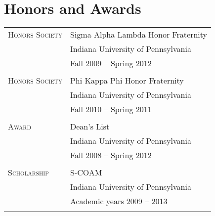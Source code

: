 \documentclass[10pt]{article}
\begin{document}
\section{Honors and Awards}
\begin{tabularx}{0.97\linewidth}{>{\raggedleft\scshape}p{3cm}X}
  Honors Society & Sigma Alpha Lambda Honor Fraternity \\
             & Indiana University of Pennsylvania \\
             & Fall 2009 -- Spring 2012  \\
       &\\
 Honors Society  & Phi Kappa Phi Honor Fraternity \\
        & Indiana University of Pennsylvania \\
        & Fall 2010 -- Spring 2011 \\
        & \\
  Award & Dean’s List \\
        & Indiana University of Pennsylvania \\
        & Fall 2008 -- Spring 2012 \\
        & \\
  Scholarship & S-COAM \\
        & Indiana University of Pennsylvania \\
        & Academic years 2009 -- 2013 \\
        & \\
\end{tabularx}
\end{document}

